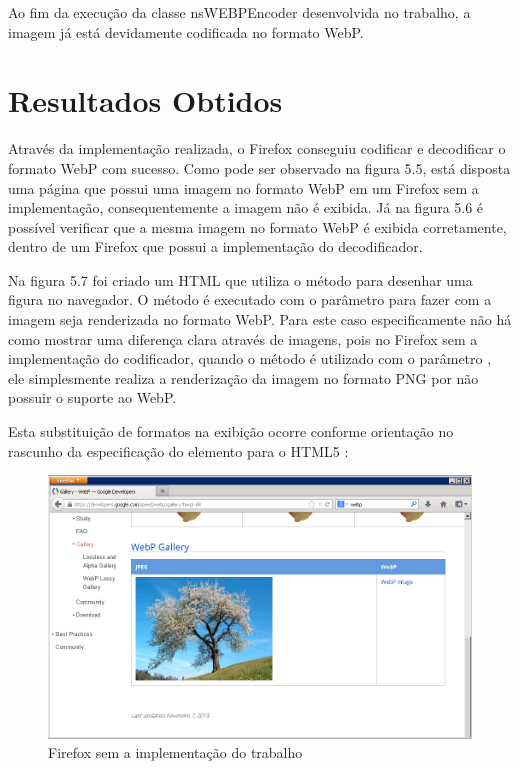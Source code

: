 \documentclass[espaco=simples,appendix=Name]{abnt}
\begin{document}
Ao fim da execução da classe nsWEBPEncoder desenvolvida no trabalho, a imagem já está devidamente codificada no formato WebP.

\section{Resultados Obtidos}

Através da implementação realizada, o Firefox conseguiu codificar e decodificar o formato WebP com sucesso. Como pode ser observado na figura 5.5, está disposta uma página que possui uma imagem no formato WebP em um Firefox sem a implementação, consequentemente a imagem não é exibida. Já na figura 5.6 é possível verificar que a mesma imagem no formato WebP é exibida corretamente, dentro de um Firefox que possui a implementação do decodificador. 

Na figura 5.7 foi criado um HTML que utiliza o método  para desenhar uma figura no navegador. O método  é executado com o parâmetro  para fazer com a imagem seja renderizada no formato WebP. Para este caso especificamente não há como mostrar uma diferença clara através de imagens, pois no Firefox sem a implementação do codificador, quando o método  é utilizado com o parâmetro , ele simplesmente realiza a renderização da imagem no formato PNG por não possuir o suporte ao WebP. 

Esta substituição de formatos na exibição ocorre conforme orientação no rascunho da especificação do elemento  para o HTML5 \cite{CanvasElement}:
\begin{citacao}
\end{citacao}

\begin{figure}[h]
  \centering
    \includegraphics[scale=0.4]{FirefoxSemWebP.png}
  \caption{Firefox sem a implementação do trabalho}
\end{figure}
\end{document}
